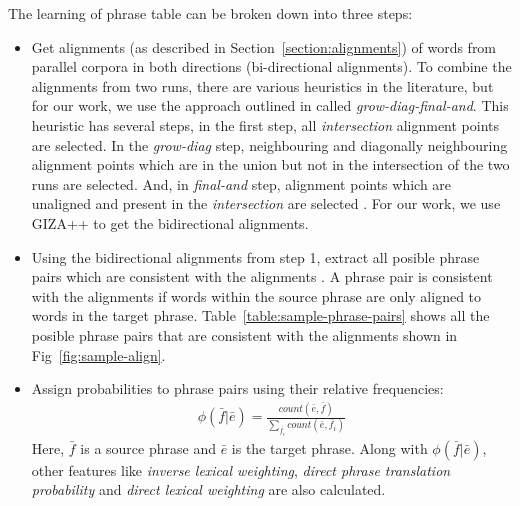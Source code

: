 The learning of phrase table can be broken down into three steps:
\begin{itemize}
	\item Get alignments (as described in Section~\ref{section:alignments}) of words from parallel corpora in both directions (bi-directional alignments). To combine the alignments from two runs, there are various heuristics in the literature, but for our work, we use the approach outlined in \cite{Koehn2003} called \textit{grow-diag-final-and}. This heuristic has several steps, in the first step, all \textit{intersection} alignment points are selected. In the \textit{grow-diag} step, neighbouring and diagonally neighbouring alignment points which are in the union but not in the intersection of the two runs are selected. And, in \textit{final-and} step, alignment points which are unaligned and present in the \textit{intersection} are selected . For our work, we use GIZA++ \cite{Och2003} to get the bidirectional alignments.
	
	\item Using the bidirectional alignments from step 1, extract all posible phrase pairs which are consistent with the alignments \cite{Och1999, Koehn2003}. A phrase pair is consistent with the alignments if words within the source phrase are only aligned to words in the target phrase. Table~\ref{table:sample-phrase-pairs} shows all the posible phrase pairs that are consistent with the alignments shown in Fig~\ref{fig:sample-align}.
	
	\item Assign probabilities to phrase pairs using their relative frequencies:
	\begin{eqnarray}
		\phi(\bar{f}|\bar{e}) = \frac{count(\bar{e}, \bar{f})}{\sum_{\bar{f_i}} count(\bar{e}, \bar{f_i})}
	\end{eqnarray}
	Here, $\bar{f}$ is a source phrase and $\bar{e}$ is the target phrase. Along with $\phi(\bar{f} | \bar{e})$, other features like \textit{inverse lexical weighting}, \textit{direct phrase translation probability} and \textit{direct lexical weighting} are also calculated.
\end{itemize}

